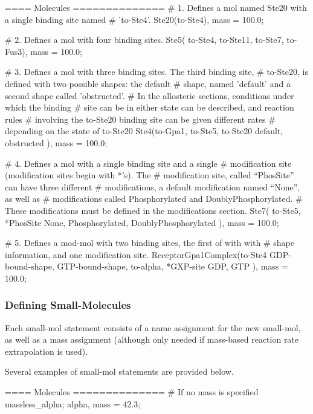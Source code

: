 \begin{ExampleMZR}[label=examplemodmolssec]
==== Molecules ==============
    # 1. Defines a mol named Ste20 with a single binding site named
    # 'to-Ste4'. 
    Ste20(to-Ste4),
        mass = 100.0;

    # 2. Defines a mol with four binding sites.
    Ste5( to-Ste4, to-Ste11, to-Ste7, to-Fus3),
         mass = 100.0;

    # 3. Defines a mol with three binding sites.  The third binding site,
    # to-Ste20, is defined with two possible shapes: the default
    # shape, named 'default' and a second shape called 'obstructed'.
    # In the allosteric sections, conditions under which the binding
    # site can be in either state can be described, and reaction rules
    # involving the to-Ste20 binding site can be given different rates
    # depending on the state of to-Ste20
    Ste4(to-Gpa1, to-Ste5, to-Ste20 { default, obstructed} ),
         mass = 100.0;

    # 4. Defines a mol with a single binding site and a single
    # modification site (modification sites begin with *'s). The
    # modification site, called ``PhosSite'' can have three different
    # modifications, a default modification named ``None'', as well as
    # modifications called Phosphorylated and DoublyPhosphorylated.
    # These modifications must be defined in the modifications section.
    Ste7( to-Ste5, *PhosSite { None, Phosphorylated, DoublyPhosphorylated } ),
         mass = 100.0;

    # 5. Defines a mod-mol with two binding sites, the first of with with
    # shape information, and one modification site.
    ReceptorGpa1Complex(to-Ste4 { GDP-bound-shape, GTP-bound-shape},  
                        to-alpha, *GXP-site { GDP, GTP} ), 
   	mass = 100.0;
\end{ExampleMZR}

\subsubsection{Defining Small-Molecules}
Each small-mol statement consists of a name assignment for the new
small-mol, as well as a mass assignment (although only needed if
mass-based reaction rate extrapolation is used).  

Several examples of small-mol statements are provided below.  
\begin{ExampleMZR}
  ==== Molecules ==============
     # If no mass is specified
     massless_alpha; 
     alpha, mass = 42.3;

\end{ExampleMZR}


